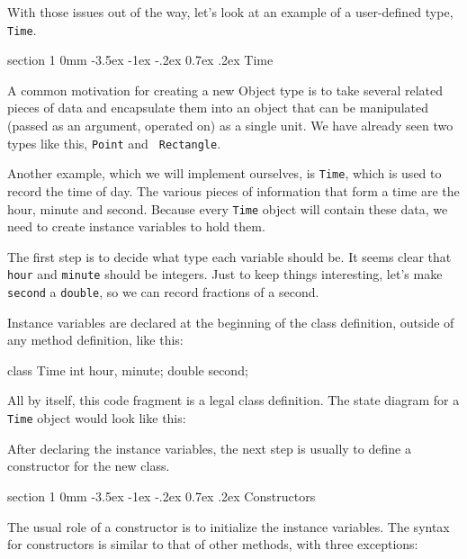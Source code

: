 \documentclass{book}
\makeatletter
\renewcommand{\section}{\@startsection 
    {section} {1} {0mm}%
    {-3.5ex \@plus -1ex \@minus -.2ex}%
    {0.7ex \@plus.2ex}%
    {\normalfont\Large\bfseries}}
\makeatother
\begin{document}
With those issues out of the way, let's look at an example of
a user-defined type, {\tt Time}.

\section{Time}

A common motivation for creating a new Object type is to take several
related pieces of data and encapsulate them into an object that can be
manipulated (passed as an argument, operated on) as a single unit.  We
have already seen two types like this, {\tt Point} and {\tt
Rectangle}.

Another example, which we will implement ourselves, is {\tt Time},
which is used to record the time of day.  The various pieces of
information that form a time are the hour, minute and second.  Because
every {\tt Time} object will contain these data, we need to create
instance variables to hold them.

The first step is to decide what type each variable should be.  It
seems clear that {\tt hour} and {\tt minute} should be integers.  Just
to keep things interesting, let's make {\tt second} a {\tt double}, so
we can record fractions of a second.


Instance variables are declared at the beginning of the class
definition, outside of any method definition, like this:

\begin{verbatimtab}
class Time {
  int hour, minute;
  double second;
}
\end{verbatimtab}
%
All by itself, this code fragment is a legal class definition.  The
state diagram for a {\tt Time} object would look like this:




After declaring the instance variables, the next step is usually
to define a constructor for the new class.

\section{Constructors}

The usual role of a constructor is to initialize the instance
variables.  The syntax for constructors is similar to that
of other methods, with three exceptions:
\end{document}
